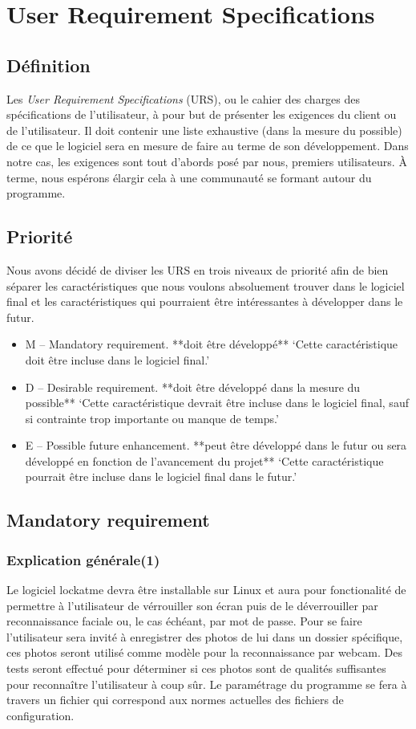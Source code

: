 \chapter{User Requirement Specifications}
\newpage
\section{Définition}
Les \emph{User Requirement Specifications} (URS), ou le cahier des charges des
spécifications de l’utilisateur, à pour but de présenter les exigences du
client ou de l’utilisateur. Il doit contenir une liste exhaustive
(dans la mesure du possible) de ce que le logiciel sera en mesure de faire au
terme de son développement. Dans notre cas, les exigences sont tout d’abords
posé par nous, premiers utilisateurs. À terme, nous espérons élargir cela à
une communauté se formant autour du programme.

\section{Priorité}
Nous avons décidé de diviser les URS en trois niveaux de priorité afin de bien
séparer les caractéristiques que nous voulons absoluement trouver dans le
logiciel final et les caractéristiques qui pourraient être intéressantes à
développer dans le futur.
\begin{itemize}
  \item{M – Mandatory requirement. **doit être développé**
‘Cette caractéristique doit être incluse dans le logiciel final.’}
  \item{D – Desirable requirement. **doit être développé dans la mesure du
  possible**
‘Cette caractéristique devrait être incluse dans le logiciel final, sauf si
contrainte trop importante ou manque de temps.’}
  \item{E – Possible future enhancement. **peut être développé dans le futur
  ou sera développé en fonction de l’avancement du projet**
‘Cette caractéristique pourrait être incluse dans le logiciel final dans le
futur.’}
\end{itemize}

\section{Mandatory requirement}
  \subsection{Explication générale(1)}
Le logiciel lockatme devra être installable sur Linux et aura pour
fonctionalité de permettre à l’utilisateur de vérrouiller son écran puis de
le déverrouiller par reconnaissance faciale ou, le cas échéant, par mot de
passe. Pour se faire l’utilisateur sera invité à enregistrer des photos de
lui dans un dossier spécifique, ces photos seront utilisé comme modèle pour la
reconnaissance par webcam. Des tests seront effectué pour déterminer si ces
photos sont de qualités suffisantes pour reconnaître l’utilisateur à coup sûr.
Le paramétrage du programme se fera à travers un fichier qui correspond aux
normes actuelles des fichiers de configuration.

